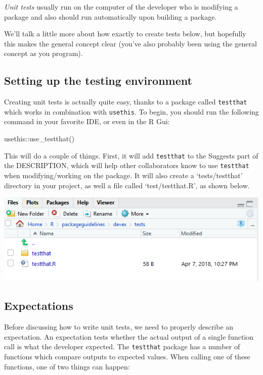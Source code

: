 \documentclass[
]{book}
\newenvironment{Shaded}{\begin{snugshade}}{\end{snugshade}}
\newcommand{\FunctionTok}[1]{\textcolor[rgb]{0.00,0.00,0.00}{#1}}
\newcommand{\NormalTok}[1]{#1}
\newcommand{\SpecialCharTok}[1]{\textcolor[rgb]{0.00,0.00,0.00}{#1}}
\begin{document}
\emph{Unit tests} usually run on the computer of the developer who is modifying a package and also should run automatically upon building a package.

We'll talk a little more about how exactly to create tests below, but hopefully this makes the general concept clear (you've also probably been using the general concept as you program).

\hypertarget{setting-up-the-testing-environment}{%
\subsection{Setting up the testing environment}\label{setting-up-the-testing-environment}}

Creating unit tests is actually quite easy, thanks to a package called \texttt{testthat} which works in combination with \texttt{usethis}. To begin, you should run the following command in your favorite IDE, or even in the R Gui:

\begin{Shaded}
\begin{Highlighting}[]
\NormalTok{usethis}\SpecialCharTok{::}\FunctionTok{use\_testthat}\NormalTok{()}
\end{Highlighting}
\end{Shaded}

This will do a couple of things. First, it will add \texttt{testthat} to the Suggests part of the DESCRIPTION, which will help other collaborators know to use \texttt{testthat} when modifying/working on the package. It will also create a `tests/testthat' directory in your project, as well a file called `test/testthat.R', as shown below.

\includegraphics{images/testSS/devtoolstestthat.PNG}

\hypertarget{expectations}{%
\subsection{Expectations}\label{expectations}}

Before discussing how to write unit tests, we need to properly describe an expectation. An expectation tests whether the actual output of a single function call is what the developer expected. The \texttt{testthat} package has a number of functions which compare outputs to expected values. When calling one of these functions, one of two things can happen:
\end{document}
